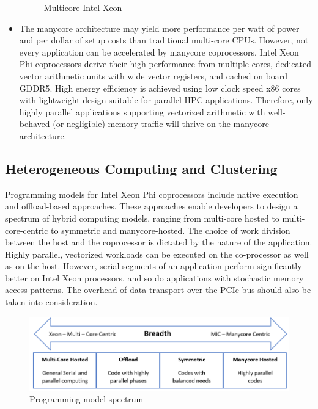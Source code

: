 \documentclass[12pt]{article}
\begin{document}
\begin{itemize}
\begin{figure}[ht]
\begin{minipage}[b]{0.5\linewidth}
    \caption{Multicore Intel Xeon}
  \end{minipage}
\end{figure}
\item The manycore architecture may yield more performance per watt of power and per dollar of setup costs than traditional multi-core CPUs. However, not every application can be accelerated by manycore coprocessors. Intel Xeon Phi coprocessors derive their high performance from multiple cores, dedicated vector arithmetic units with wide vector registers, and cached on board GDDR5. High energy efficiency is achieved using low clock speed x86 cores with lightweight design suitable for parallel HPC applications. Therefore, only highly parallel applications supporting vectorized arithmetic with well-behaved (or negligible) memory traffic will thrive on the manycore architecture.
\end{itemize}
\newpage
\subsection{Heterogeneous Computing and Clustering}
Programming models for Intel Xeon Phi coprocessors include native execution and offload-based approaches. These approaches enable developers to design a spectrum of hybrid computing models, ranging from multi-core hosted to multi-core-centric to symmetric and manycore-hosted. The choice of work division between the host and the coprocessor is dictated by the nature of the application. Highly parallel, vectorized workloads can be executed on the co-processor as well as on the host. However, serial segments of an application perform significantly better on Intel Xeon processors, and so do applications with stochastic memory access patterns. The overhead of data transport over the PCIe bus should also be taken into consideration. 
\begin{figure}[H]
\centering
\includegraphics[scale = 0.9]{chainer3.png}
\caption{Programming model spectrum}
\end{figure}
\end{document}
